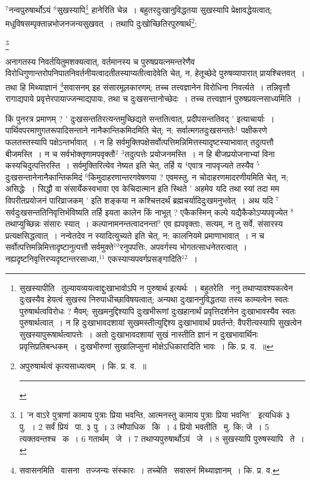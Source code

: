 \documentclass[11pt, openany]{book}
\newcommand\blfootnote[1]{%
 \begingroup
 \renewcommand\thefootnote{}\footnote{#1}%
 \addtocounter{footnote}{-1}%
 \endgroup
}
\begin{document}
${}^7$नन्वपुरुषार्थोऽयं ${}^8$सुखस्यापि\renewcommand{\thefootnote}{४}\footnote{सुखस्यापीति \textendash\ तुल्यायव्ययत्वाद्दुःखाभावोऽपि न पुरुषार्थ इत्यर्थः~। बहुतरेति \textendash\ ननु तथाप्यावश्यकत्वेन दुःखस्यैव हेयत्वं सुखस्य निरुपाधीच्छाविषयत्वात्; अन्यथा दुःखाननुविद्धतया तस्य काम्यत्वेन स्वतः पुरुषार्थत्वविरोधः ? मैवम्; सुखमनुद्दिश्यापि दुःखभीरूणां दुःखहानार्थं प्रवृत्तिदर्शनेन दुःखाभावस्यैव स्वतः पुरुषार्थत्वात्~। न हि दुःखाभावदशायां सुखमस्तीत्युद्दिश्य दुःखाभावार्थं प्रवर्तन्ते; वैपरीत्यस्यापि सुखत्वेन सुखस्यापुरूषार्थत्वापत्तेः~। अतो दुःखाभावदशायां सुखं नास्तीति ज्ञानं न दुःखभावार्थिनः प्रवृत्तिप्रतिबन्धकम्~। दुःखभीरुणां सुखालिप्सुनां मोक्षेऽधिकारादिति भावः~। कि. प्र. व.~॥} हानेरिति चेन्न~। बहुतरदुःखानुविद्धतया सुखस्यापि प्रेक्षावद्धेयत्वात्; मधुविषसम्पृक्तान्नभोजनजन्यसुखवत्~। तथापि दुःखोच्छितिरपुरुषार्थ\renewcommand{\thefootnote}{५}\footnote{अपुरुषार्थत्वं कृत्यसाध्यत्वम्~। कि. प्र. व.~॥ \rule{0.4\linewidth}{0.5pt}};

\blfootnote{1 'न वाऽरे पुत्राणां कामाय पुत्राः प्रिया भवन्ति, आत्मनस्तु कामाय पुत्राः प्रिया भवन्ति'  \textendash\ इत्यधिकं ३ पु.~। 2 सर्वं प्रियं  \textendash\ पा. ३ पु~। 3 त्मौपाधिक  \textendash\ कि~। 4 प्रियो भवतीति  \textendash\ मु. कि; जे~। 5 त्यक्तवन्तश्च \textendash\ क~। 6 गतार्थम्  \textendash\ जे~। 7 तथाप्यपुरुषार्थोऽयं  \textendash\ जे~। 8 सुखस्यापि पुरुषस्यापि  \textendash\ ते~।}

\newpage
\noindent
अनागतस्य निवर्तयितुमशक्यत्वात्, वर्तमानस्य च पुरुषप्रयत्नमन्तरेणैव विरोधिगुणान्तरोपनिपातनिवर्तनीयत्वादतीतस्याप्यतीत्वादेवेति चेत्, न, हेतूच्छेदे पुरुषव्यापारात् प्रायश्चित्तवत्~। तथा हि मिथ्याज्ञानं \renewcommand{\thefootnote}{१}\footnote{सवासनमिति \textendash\ वासना \textendash\ तज्जन्यः संस्कारः~। तच्चेति \textendash\ सवासनं मिथ्याज्ञानम्~। कि. प्र. व.}सवासनम् इह संसारमूलकारणम्; तच्च तत्त्वज्ञानेन विरोधिना निवर्त्यते~। तन्निवृत्तौ रागाद्यपाये प्रवृत्तेरपायाज्जन्माद्यपायः, तथा च दुःखसन्तानोच्छेदः~। तच्च तत्त्वज्ञानं पुरुषप्रयत्नसाध्यमिति~। 

किं पुनरत्र प्रमाणम् ? ' दुःखसन्ततिरत्यन्तमुच्छिद्यते सन्ततित्वात्, प्रदीपसन्ततिवद् ' इत्याचार्याः~। पार्थिवपरमाणुगतरूपादिसन्ताने नानैकान्तिकमिदमिति चेत्; न; सर्वात्मगतदुःखसन्ततेः$^1$ पक्षीकरणे फलतस्तस्यापि पक्षेऽन्तर्भावात्~। न हि सर्वमुक्तिपक्षेसर्वोत्पत्तिमन्निमित्तस्यादृष्टस्याभावात् तदुत्पत्तौ बीजमस्ति~। न च सर्वभोक्तृणामपवृक्तौ$^2$ ${}^3$तदुत्पत्तेः प्रयोजनमस्ति~। न हि बीजप्रयोजनाभ्यां विना कस्यचिदुत्पत्तिरस्ति~। सर्वमुक्तिरित्येव नेष्यत इति चेत्, तर्हि य ${}^4$एवात्र नापवृज्यते तस्यैव ${}^5$दुःखसन्तानेनानैकान्तिकमिदं ${}^6$किमुदाहरणान्तरगवेषणया ? एवमस्तु, न चोदाहरणमादरणीयमिति चेत्, न; असिद्धेः~। सिद्धौ वा संसार्येकस्वभावा एव केचिदात्मान इति स्थिते ' अहमेव यदि तथा स्यां तदा मम विपरीतप्रयोजनं पारिव्राजकम् ' इति शङ्कया न कश्चित्तदर्थं ब्रह्मचर्यादिदुःखमनुभवेत्~। अथ यदि ${}^7$सर्वदुःखसन्ततिनिवृत्तिर्भविष्यति तर्हि इयता कालेन किं नाभूत् ? एकैकस्मिन् कल्पे यद्यैकैकोऽप्यपवृज्येत ${}^8$तथाप्युच्छिन्नः संसारः स्यात्~। कल्पानामनन्तत्वादनन्ता$^9$ एव ह्यपवृक्ताः, सत्यम्, न तु सर्वे, संसारस्य प्रत्यक्षसिद्धत्वात्~। नन्वेतदेव न स्यादित्युच्यते इति चेत्, न; कालनियमे प्रमाणाभावात्~। न च सर्वोत्पत्तिमन्निमित्तादृष्टानुत्पत्तौ सर्वमुक्ते${}^10$रनुपपत्तिः, अपवर्गस्य भोगतत्साधनेतरत्वात्~। नह्यदृष्टनिवृत्तिरप्यदृष्टान्तरसाध्या,$^11$ एकस्याप्यपवर्गप्रसङ्गादिति$^12$~।
\end{document}
